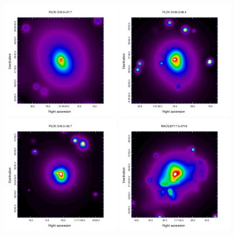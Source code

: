 \documentclass[11pt,a4paper,twoside,graphicx,color]{article}
\begin{document}
{\begin{figure}[h]
\centering	
\includegraphics[width=0.45\textwidth]{./PSZ1G045_gwp.pdf}   
\hfill
\includegraphics[width=0.45\textwidth]{./PSZ1G155_gwp.pdf}   
\hfill
\includegraphics[width=0.45\textwidth]{./PSZ1G046_gwp.pdf}   
\hfill
\includegraphics[width=0.45\textwidth]{./MACSJ0717_gwp.pdf}   

\end{figure}}
\end{document}
